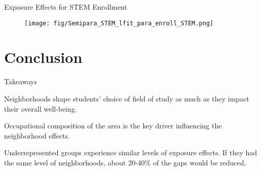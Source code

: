 \documentclass[aspectratio=169,xcolor=dvipsnames]{beamer}
\newenvironment{wideitemize}{\itemize\addtolength{\itemsep}{10pt}}{\enditemize}
\begin{document}
\begin{frame}{Exposure Effects for STEM Enrollment}

\begin{figure}[H]
    \centering
    		\texttt{[image: fig/Semipara\_STEM\_lfit\_para\_enroll\_STEM.png]}
	
    \end{figure}

\end{frame}


	


	

\section{Conclusion}

\begin{frame}{Takeaways}
    \begin{wideitemize}
        \item Neighborhoods shape students' choice of field of study as much as they impact their overall well-being.
        \item Occupational composition of the area is the key driver influencing the neighborhood effects.
        \item Underrepresented groups experience similar levels of exposure effects. If they had the same level of neighborhoods, about 20-40\% of the gaps would be reduced.
    \end{wideitemize}
\end{frame}

\appendix
\end{document}
